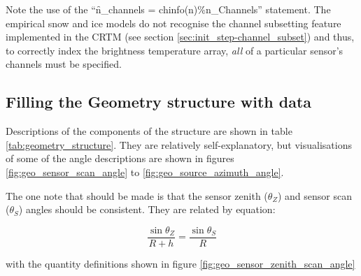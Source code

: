 Note the use of the ``\f{n\_channels = chinfo(n)\%n\_Channels}'' statement. The empirical snow and ice models do not recognise the channel subsetting feature implemented in the CRTM (see section \ref{sec:init_step-channel_subset}) and thus, to correctly index the brightness temperature array, \emph{all} of a particular sensor's channels must be specified.



\subsection{Filling the Geometry structure with data}

Descriptions of the components of the \hyperref[sec:geometry_structure]{\Geometry} structure are shown in table \ref{tab:geometry_structure}. They are relatively self-explanatory, but visualisations of some of the angle descriptions are shown in figures \ref{fig:geo_sensor_scan_angle} to \ref{fig:geo_source_azimuth_angle}.

The one note that should be made is that the sensor zenith ($\theta_Z$) and sensor scan ($\theta_S$) angles should be consistent. They are related by equation:

\begin{equation}
  \frac{\sin\theta_Z}{R+h} = \frac{\sin\theta_S}{R}
  \label{eqn:sensor_zenith_scan_angle}
\end{equation}

with the quantity definitions shown in figure \ref{fig:geo_sensor_zenith_scan_angle}

